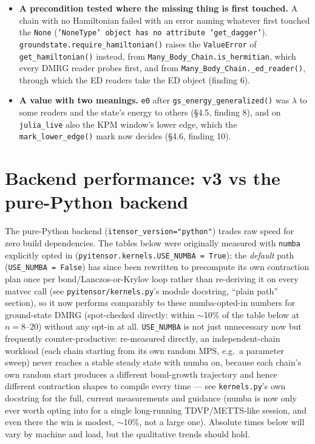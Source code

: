 \documentclass[11pt]{article}
\begin{document}
\begin{itemize}
    \texttt{Fermionic\_Chain.gs\_energy()}'s own ED branch, a third entry
    point that dropped them the same way, delegates to the base class.
  \item \textbf{A precondition tested where the missing thing is first
    touched.} A chain with no Hamiltonian failed with an error naming
    whatever first touched the \texttt{None} (\texttt{'NoneType' object has
    no attribute 'get\_dagger'}). \texttt{groundstate.require\_hamiltonian()}
    raises the \texttt{ValueError} of \texttt{get\_hamiltonian()} instead,
    from \texttt{Many\_Body\_Chain.is\_hermitian}, which every DMRG reader
    probes first, and from \texttt{Many\_Body\_Chain.\_ed\_reader()},
    through which the ED readers take the ED object (finding 6).
  \item \textbf{A value with two meanings.} \texttt{e0} after
    \texttt{gs\_energy\_generalized()} was $\lambda$ to some readers and the
    state's energy to others (\S4.5, finding 8), and on \texttt{julia\_live}
    also the KPM window's lower edge, which the
    \texttt{mark\_lower\_edge()} mark now decides (\S4.6, finding 10).
\end{itemize}

\section{Backend performance: v3 vs the pure-Python backend}
\label{sec:perf}

The pure-Python backend (\texttt{itensor\_version="python"}) trades raw
speed for zero build dependencies. The tables below were originally
measured with \texttt{numba} explicitly opted in
(\texttt{pyitensor.kernels.USE\_NUMBA = True}); the \emph{default} path
(\texttt{USE\_NUMBA = False}) has since been rewritten to precompute its
own contraction plan once per bond/Lanczos-or-Krylov loop rather than
re-deriving it on every matvec call (see \texttt{pyitensor/kernels.py}'s
module docstring, ``plain path'' section), so it now performs comparably
to these numba-opted-in numbers for ground-state DMRG (spot-checked
directly: within $\sim$10\% of the table below at $n=8$--$20$) without
any opt-in at all. \texttt{USE\_NUMBA} is not just unnecessary now but
frequently counter-productive: re-measured directly, an independent-chain
workload (each chain starting from its own random MPS, e.g.\ a parameter
sweep) never reaches a stable steady state with numba on, because each
chain's own random start produces a different bond-growth trajectory and
hence different contraction shapes to compile every time --- see
\texttt{kernels.py}'s own docstring for the full, current measurements
and guidance (numba is now only ever worth opting into for a single
long-running TDVP/METTS-like session, and even there the win is modest,
$\sim$10\%, not a large one). Absolute times below will vary by machine
and load, but the qualitative trends should hold.
\end{document}

